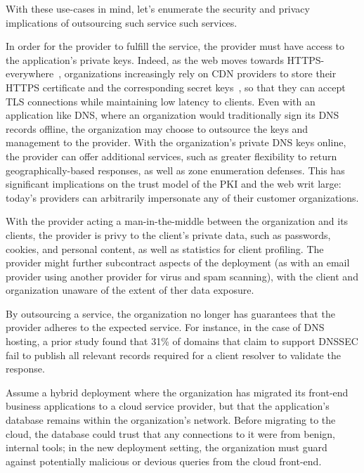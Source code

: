 With these use-cases in mind, let's enumerate the security and privacy
implications of outsourcing such service such services.


%
In order for the provider to fulfill the service, the provider must
have access to the application's private keys.
%
Indeed, as the web moves towards HTTPS-everywhere~\cite{felt-2017-https},
organizations increasingly rely on CDN providers to store their HTTPS
certificate and the corresponding secret keys~\cite{key-sharing,
when-https-meets-cdn}, so that they can accept TLS connections while
maintaining low latency to clients.
%
Even with an application like DNS, where an organization would traditionally sign
its DNS records offline, the organization may choose to outsource the keys
and management to the provider.
%
With the organization's private DNS keys online, the provider can offer
additional services, such as greater flexibility to return geographically-based
responses, as well as zone enumeration defenses.
%
This has significant implications on the trust model of the PKI and the web
writ large: today's providers can arbitrarily impersonate any of their customer
organizations.


%
With the provider acting a man-in-the-middle between the
organization and its clients, the provider is privy to the client's private
data, such as passwords, cookies, and personal content, as well as statistics
for client profiling.
%
The provider might further subcontract aspects of the deployment (as with an
email provider using another provider for virus and spam scanning), with
the client and organization unaware of the extent of ther data exposure.


%
By outsourcing a service, the organization no longer has guarantees that the
provider adheres to the expected service.
%
For instance, in the case of DNS hosting, a prior study found that 31\% of
domains that claim to support DNSSEC fail to publish all relevant records
required for a client resolver to validate the response.


%
Assume a hybrid deployment where the organization has migrated its front-end
business applications to a cloud service provider, but that the application's
database remains within the organization’s network. 
%
Before migrating to the cloud, the database could trust that any connections to
it were from benign, internal tools; in the new deployment setting, the
organization must guard against potentially malicious or devious queries from
the cloud front-end.


